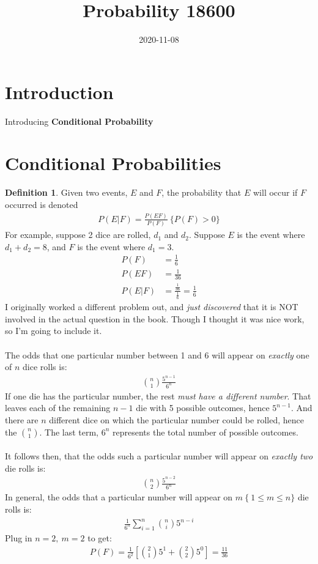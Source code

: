 \documentclass{article}
\title{Probability 18600}
\date{2020-11-08}
\theoremstyle{definition}
\newtheorem*{definition}{Definition}
\theoremstyle{axiom}
\theoremstyle{proposition}
\begin{document}
\maketitle
\section{Introduction}
Introducing \textbf{Conditional Probability}
\section{Conditional Probabilities}

\begin{definition}
  Given two events, $E$ and $F$, the probability that $E$ will occur if $F$  occurred
  is denoted
  \begin{align}
    P(E|F)=\frac{P(EF)}{P(F)}~\{P(F)>0\}
  \end{align}
  For example, suppose 2 dice are rolled, $d_{1}$ and $d_{2}$.  Suppose $E$ is the event where $d_{1}+d_{2}=8$,
  and $F$ is the event where $d_{1}=3$.
  \begin{align*}
    P(F)   & =\frac{1}{6}                                  \\
    P(EF)  & =\frac{1}{36}                                 \\
    P(E|F) & =\frac{\frac{1}{36}}{\frac{1}{6}}=\frac{1}{6}
  \end{align*}
  I originally worked a different problem out, and \textit{just discovered} that
  it is NOT involved in the actual question in the book.
  Though I thought it was nice work, so I'm going to include it.
  \mbox{}\\ \\
  The odds that one particular number between 1 and 6 will appear on
  \textit{exactly} one of $n$ dice rolls is:
  \begin{align*}
    {n \choose 1}\frac{5^{n-1}}{6^n}
  \end{align*}
  If one die has the particular number, the rest \textit{must have a different number}.
  That leaves each of the remaining $n-1$ die with 5 possible outcomes, hence $5^{n-1}$.
  And there are $n$ different dice on which the particular number could be rolled, hence
  the $n\choose1$.  The last term, $6^n$ represents the total number of possible outcomes.
  \mbox{}\\ \\
  It follows then, that the odds such a particular number will appear on \textit{exactly two}
  die rolls is:
  \begin{align*}
    {n\choose2}\frac{5^{n-2}}{6^n}
  \end{align*}
  In general, the odds that a particular number will appear on $m~\{~1\leq m\leq n\}$ die rolls is:
  \begin{align*}
    \frac{1}{6^n}\sum_{i=1}^{n}{n\choose i}5^{n-i}
  \end{align*}
  Plug in $n=2,~m=2$ to get:
  \begin{align*}
    P(F)=\frac{1}{6^2}\left[{2\choose1}5^1+{2\choose2}5^0\right]=\frac{11}{36}
  \end{align*}
\end{definition}
\end{document}
